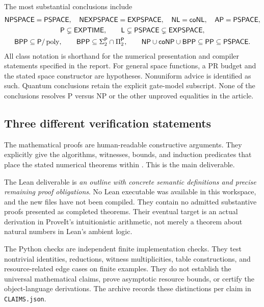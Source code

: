 The most substantial conclusions include
\begin{gather*}
 \mathsf{NPSPACE}=\mathsf{PSPACE},\quad
 \mathsf{NEXPSPACE}=\mathsf{EXPSPACE},\quad
 \mathsf{NL}=\mathsf{coNL},\quad
 \mathsf{AP}=\mathsf{PSPACE},\\
 \mathsf P\subsetneq\mathsf{EXPTIME},\qquad
 \mathsf L\subsetneq\mathsf{PSPACE}\subsetneq\mathsf{EXPSPACE},\\
 \mathsf{BPP}\subseteq\mathsf P/\operatorname{poly},\qquad
 \mathsf{BPP}\subseteq\Sigma_2^{\mathsf P}\cap\Pi_2^{\mathsf P},\qquad
 \mathsf{NP}\cup\mathsf{coNP}\cup\mathsf{BPP}\subseteq\mathsf{PP}\subseteq\mathsf{PSPACE}.
\end{gather*}
All class notation is shorthand for the numerical presentation and compiler statements specified in the report. For general space functions, a PR budget and the stated space constructor are hypotheses. Nonuniform advice is identified as such. Quantum conclusions retain the explicit gate-model subscript. None of the conclusions resolves P versus NP or the other unproved equalities in the article.

\subsection{Three different verification statements}
The mathematical proofs are human-readable constructive arguments. They explicitly give the algorithms, witnesses, bounds, and induction predicates that place the stated numerical theorems within \ipra. This is the main deliverable.

The Lean deliverable is \emph{an outline with concrete semantic definitions and precise remaining proof obligations}. No Lean executable was available in this workspace, and the new files have not been compiled. They contain no admitted substantive proofs presented as completed theorems. Their eventual target is an actual derivation in ProveIt's intuitionistic arithmetic, not merely a theorem about natural numbers in Lean's ambient logic.

The Python checks are independent finite implementation checks. They test nontrivial identities, reductions, witness multiplicities, table constructions, and resource-related edge cases on finite examples. They do not establish the universal mathematical claims, prove asymptotic resource bounds, or certify the object-language derivations. The archive records these distinctions per claim in \texttt{CLAIMS.json}.

